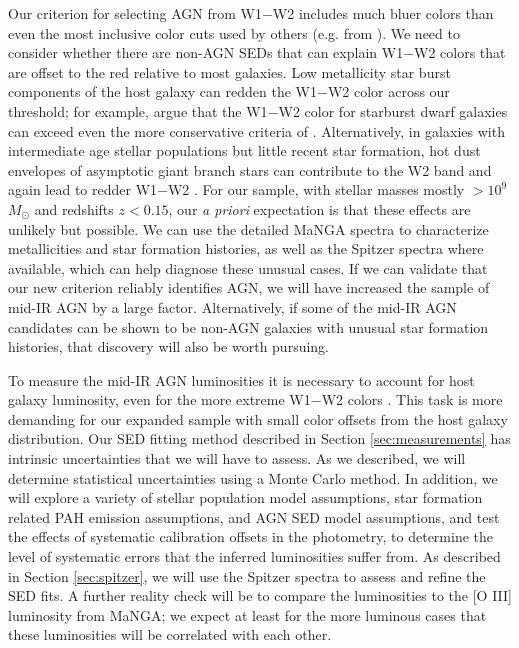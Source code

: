 \documentclass[12pt, preprint]{hacked-aastex}
\begin{document}
 Our criterion for
selecting AGN from W1$-$W2 includes much bluer colors than even the
most inclusive color cuts used by others (e.g. from \cite{assef18a}).
We need to consider whether there are non-AGN SEDs that can explain
W1$-$W2 colors that are offset to the red relative to most galaxies.
Low metallicity star burst components of the host galaxy can redden
the W1$-$W2 color across our threshold; for example,
\cite{hainline16a} argue that the W1$-$W2 color for starburst dwarf
galaxies can exceed even the more conservative criteria of
\cite{stern12a}.  Alternatively, in galaxies with intermediate age
stellar populations but little recent star formation, hot dust
envelopes of asymptotic giant branch stars can contribute to the W2
band and again lead to redder W1$-$W2 \cite{villaume15a}. For our
sample, with stellar masses mostly $> 10^9$ $M_\odot$ and redshifts
$z<0.15$, our {\it a priori} expectation is that these effects are
unlikely but possible.
We can
use the detailed MaNGA spectra to characterize metallicities and star
formation histories, as well as the Spitzer spectra where available,
which can help diagnose these unusual cases. If we can validate that
our new criterion reliably identifies AGN, we will have increased the
sample of mid-IR AGN by a large factor. Alternatively, if some of the
mid-IR AGN candidates can be shown to be non-AGN galaxies with unusual
star formation histories, that discovery will also be worth pursuing.

 To measure
the mid-IR AGN luminosities it is necessary to account for host galaxy
luminosity, even for the more extreme W1$-$W2 colors
\cite{lacy15a}. This task is more demanding for our expanded sample
with small color offsets from the host galaxy distribution. Our SED
fitting method described in Section \ref{sec:measurements} has
intrinsic uncertainties that we will have to assess. As we described,
we will determine statistical uncertainties using a Monte Carlo
method.  In addition, we will explore a variety of stellar population
model assumptions, star formation related PAH emission assumptions,
and AGN SED model assumptions, and test the effects of systematic
calibration offsets in the photometry, to determine the level of
systematic errors that the inferred luminosities suffer from. As
described in Section \ref{sec:spitzer}, we will use the Spitzer
spectra to assess and refine the SED fits. A further reality check
will be to compare the luminosities to the [O III] luminosity from
MaNGA; we expect at least for the more luminous cases that these
luminosities will be correlated with each other.
\end{document}
